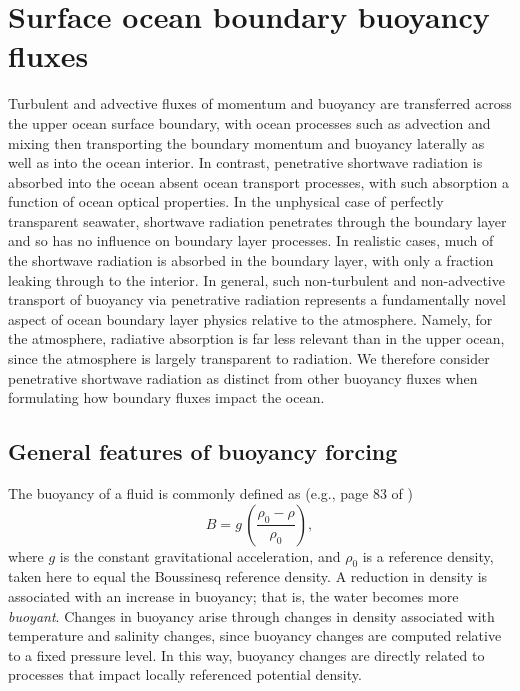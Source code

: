 \section{Surface ocean boundary buoyancy fluxes}
\label{section:boundary-forcing-buoyancy-kpp}

Turbulent and advective fluxes of momentum and buoyancy are
transferred across the upper ocean surface boundary, with ocean
processes such as advection and mixing then transporting the boundary
momentum and buoyancy laterally as well as into the ocean interior.
In contrast, penetrative shortwave radiation is absorbed into the
ocean absent ocean transport processes, with such absorption a
function of ocean optical properties.  In the unphysical case of
perfectly transparent seawater, shortwave radiation penetrates through
the boundary layer and so has no influence on boundary layer
processes.  In realistic cases, much of the shortwave radiation is
absorbed in the boundary layer, with only a fraction leaking through
to the interior. In general, such non-turbulent and non-advective
transport of buoyancy via penetrative radiation represents a
fundamentally novel aspect of ocean boundary layer physics relative to
the atmosphere.  Namely, for the atmosphere, radiative absorption is
far less relevant than in the upper ocean, since the atmosphere is
largely transparent to radiation.  We therefore consider penetrative
shortwave radiation as distinct from other buoyancy fluxes when
formulating how boundary fluxes impact the ocean.


\subsection{General features of buoyancy forcing}

The buoyancy of a fluid is commonly defined as (e.g., page 83 of
\cite{LargeKPP_lectures})
\begin{equation}
 B = g \, \left( \frac{ \rho_{0} - \rho}{\rho_{0}} \right), 
\label{eq:buoyancy-kpp}
\end{equation}
where $g$ is the constant gravitational acceleration, and $\rho_{0}$
is a reference density, taken here to equal the Boussinesq reference
density.  A reduction in density is associated with an increase in
buoyancy; that is, the water becomes more {\it buoyant}.  Changes in
buoyancy arise through changes in density associated with temperature
and salinity changes, since buoyancy changes are computed relative to
a fixed pressure level. In this way, buoyancy changes are directly
related to processes that impact locally referenced potential density.

